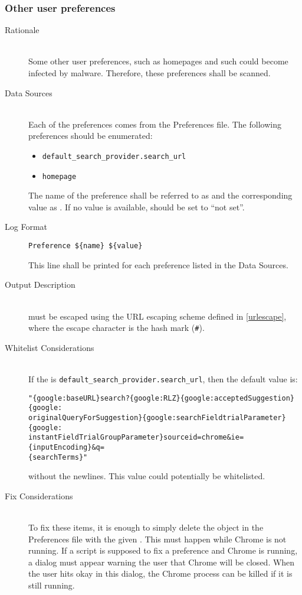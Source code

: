 \subsubsection{Other user preferences}
\begin{description}
\item[Rationale] \hfill \\
Some other user preferences, such as homepages and such could become infected by
malware.  Therefore, these preferences shall be scanned.
\item[Data Sources] \hfill \\
Each of the preferences comes from the Preferences file.  The following
preferences should be enumerated:
\begin{itemize}
  \item \verb|default_search_provider.search_url|
  \item \verb|homepage|  
\end{itemize}
The name of the preference shall be referred to as  and the
corresponding value as .  If no value is available, 
should be set to ``not set''.
\item[Log Format] \hfill 
\vspace{-\baselineskip}
\begin{verbatim}
Preference ${name} ${value}
\end{verbatim}
This line shall be printed for each preference listed in the Data Sources.
\item[Output Description] \hfill \\
 must be escaped using the URL escaping scheme defined in
\ref{urlescape}, where the escape character is the hash mark (\verb|#|).
\item[Whitelist Considerations] \hfill \\
If the  is \verb|default_search_provider.search_url|, then the default
value is:
\begin{verbatim}
"{google:baseURL}search?{google:RLZ}{google:acceptedSuggestion}{google:
originalQueryForSuggestion}{google:searchFieldtrialParameter}{google:
instantFieldTrialGroupParameter}sourceid=chrome&ie={inputEncoding}&q=
{searchTerms}"
\end{verbatim}
without the newlines.  This value could potentially be whitelisted.  
\item[Fix Considerations] \hfill \\
To fix these items, it is enough to simply delete the object in the Preferences
file with the given .  This must happen while Chrome is not running. 
If a script is supposed to fix a preference and Chrome is running, a dialog must
appear warning the user that Chrome will be closed.  When the user hits okay in
this dialog, the Chrome process can be killed if it is still running.
\end{description}

